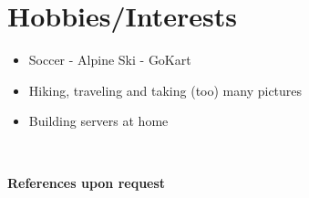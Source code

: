 \documentclass{CV}
\begin{document}
\section*{Hobbies/Interests}
\begin{itemize}\setlength\itemsep{0em}
\item Soccer - Alpine Ski - GoKart
\item Hiking, traveling and taking (too) many pictures
\item Building servers at home
\end{itemize}
~




\begin{center}
\Large \textbf{References upon request}
\end{center}
\end{document}
